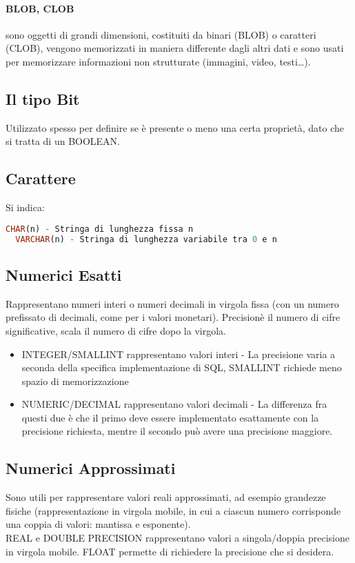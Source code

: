 \paragraph*{BLOB, CLOB} sono oggetti di grandi dimensioni, costituiti da binari (BLOB)
o caratteri (CLOB), vengono memorizzati in maniera differente dagli altri dati e sono usati per memorizzare
informazioni non strutturate (immagini, video, testi\dots).\\
\subsection{Il tipo Bit}
Utilizzato spesso per definire se è presente o meno una certa proprietà, dato
che si tratta di un BOOLEAN.
\subsection{Carattere}
Si indica:
\begin{lstlisting}[language=SQL]
  CHAR(n) - Stringa di lunghezza fissa n
  VARCHAR(n) - Stringa di lunghezza variabile tra 0 e n
\end{lstlisting}
\subsection{Numerici Esatti}
Rappresentano numeri interi o numeri decimali in virgola fissa (con un numero prefissato
di decimali, come per i valori monetari). Precisionè il numero di cifre significative,
scala il numero di cifre dopo la virgola.\\
\begin{itemize}
  \item INTEGER/SMALLINT rappresentano valori interi - La precisione varia a seconda della
  specifica implementazione di SQL, SMALLINT richiede meno spazio di memorizzazione
  \item NUMERIC/DECIMAL rappresentano valori decimali - La differenza fra questi due è che
  il primo deve essere implementato esattamente con la precisione richiesta, mentre il secondo
  può avere una precisione maggiore.
\end{itemize}
\subsection{Numerici Approssimati}
Sono utili per rappresentare valori reali approssimati, ad esempio grandezze
fisiche (rappresentazione in virgola mobile, in cui a ciascun numero corrisponde
una coppia di valori: mantissa e esponente).\\
REAL e DOUBLE PRECISION rappresentano valori a singola/doppia precisione in virgola
mobile. FLOAT permette di richiedere la precisione che si desidera.
